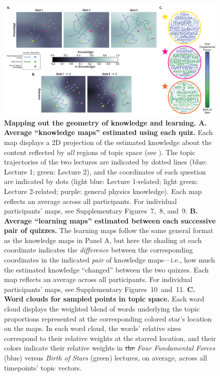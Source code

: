 \documentclass[10pt]{article}
\newcommand{\individualKnowledgeMapsA}{7} %
\newcommand{\individualKnowledgeMapsB}{8} %
\newcommand{\individualKnowledgeMapsC}{9} %
\newcommand{\individualLearningMapsA}{10} %
\newcommand{\individualLearningMapsB}{11} %
\renewcommand{\nameref}[1]{\mbox{\textit{\oldnameref{#1}}}}
\providecommand{\DIFdeltex}[1]{{\protect\color{red}\sout{#1}}}                      %
\providecommand{\DIFdelFL}[1]{\DIFdel{#1}} %
\providecommand{\DIFdelbeginFL}{} %
\providecommand{\DIFdelendFL}{} %
\providecommand{\DIFdel}[1]{\texorpdfstring{\DIFdeltex{#1}}{}} %
\newcommand{\DIFscaledelfig}{0.5}
\newlength{\DIFdelgraphicswidth} %
\newlength{\DIFdelgraphicsheight} %
\newcommand{\DIFdelincludegraphics}[2][]{%
\sbox{\DIFdelgraphicsbox}{\DIFOincludegraphics[#1]{#2}}%
\settoboxwidth{\DIFdelgraphicswidth}{\DIFdelgraphicsbox} %
\settoboxtotalheight{\DIFdelgraphicsheight}{\DIFdelgraphicsbox} %
\scalebox{\DIFscaledelfig}{%
\parbox[b]{\DIFdelgraphicswidth}{\usebox{\DIFdelgraphicsbox}\\[-\baselineskip] \rule{\DIFdelgraphicswidth}{0em}}\llap{\resizebox{\DIFdelgraphicswidth}{\DIFdelgraphicsheight}{%
\setlength{\unitlength}{\DIFdelgraphicswidth}%
\begin{picture}(1,1)%
\thicklines\linethickness{2pt} %
{\color[rgb]{1,0,0}\put(0,0){\framebox(1,1){}}}%
{\color[rgb]{1,0,0}\put(0,0){\line( 1,1){1}}}%
{\color[rgb]{1,0,0}\put(0,1){\line(1,-1){1}}}%
\end{picture}%
}\hspace*{3pt}}} %
} %
\DeclareRobustCommand{\DIFdelbeginFL}{\DIFOdelbeginFL \let\includegraphics\DIFdelincludegraphics} %
\DeclareRobustCommand{\DIFdelendFL}{\DIFOaddendFL \let\includegraphics\DIFOincludegraphics} %
\begin{document}
\begin{figure}[tp]
    \centering
    \includegraphics[width=\textwidth]{figs/knowledge_and_learning_maps}

    \caption{\textbf{Mapping out the geometry of knowledge and learning.}
    \textbf{A. Average ``knowledge maps'' estimated using each quiz.} Each map
    displays a 2D projection of the estimated knowledge about the content
    reflected by \textit{all} regions of topic space (see
    \nameref{subsec:knowledge-maps}). The topic trajectories of the two
    lectures are indicated by dotted lines (blue: Lecture 1; green: Lecture 2),
    and the coordinates of each question are indicated by dots (light blue:
    Lecture 1-related; light green: Lecture 2-related; purple: general physics
    knowledge). Each map reflects an average across all participants. For
    individual participants' maps, see Supplementary
    Figures~\individualKnowledgeMapsA,~\individualKnowledgeMapsB,
    and~\individualKnowledgeMapsC. \textbf{B. Average ``learning maps''
    estimated between each successive pair of quizzes.} The learning maps
    follow the same general format as the knowledge maps in Panel A, but here
    the shading at each coordinate indicates the \textit{difference} between
    the corresponding coordinates in the indicated \textit{pair} of knowledge
    maps---i.e., how much the estimated knowledge ``changed'' between the two
    quizzes. Each map reflects an average across all participants. For
    individual participants' maps, see Supplementary
    Figures~\individualLearningMapsA~and~\individualLearningMapsB. \textbf{C.
    Word clouds for sampled points in topic space.} Each word cloud displays
    the weighted blend of words underlying the topic proportions represented at
    the corresponding colored star's location on the maps. In each word cloud,
    the words' relative sizes correspond to their relative weights at the
    starred location, and their colors indicate their relative weights in
    \DIFdelbeginFL \DIFdelFL{the
    }\DIFdelendFL \textit{Four Fundamental Forces} (blue) versus \textit{Birth of Stars}
    (green) lectures, on average, across all timepoints' topic vectors.}

    \label{fig:knowledge-maps}
    \end{figure}
\end{document}
